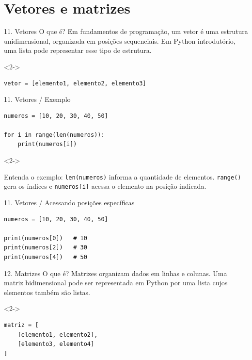 \section{Vetores e matrizes}

\begin{frame}[fragile,t]{11. Vetores}
O que é? Em fundamentos de programação, um vetor é uma estrutura unidimensional, organizada em posições sequenciais. Em Python introdutório, uma lista pode representar esse tipo de estrutura.\par
\begin{visibleenv}<2->
\begin{lstlisting}
vetor = [elemento1, elemento2, elemento3]
\end{lstlisting}
\end{visibleenv}
\end{frame}

\begin{frame}[fragile,t]{11. Vetores / Exemplo}
\begin{lstlisting}
numeros = [10, 20, 30, 40, 50]

for i in range(len(numeros)):
    print(numeros[i])
\end{lstlisting}
\begin{visibleenv}<2->
\begin{EMASCnote}
Entenda o exemplo: \texttt{len(numeros)} informa a quantidade de elementos. \texttt{range()} gera os índices e \texttt{numeros[i]} acessa o elemento na posição indicada.
\end{EMASCnote}
\end{visibleenv}
\end{frame}

\begin{frame}[fragile,t]{11. Vetores / Acessando posições específicas}
\begin{lstlisting}
numeros = [10, 20, 30, 40, 50]

print(numeros[0])   # 10
print(numeros[2])   # 30
print(numeros[4])   # 50
\end{lstlisting}
\end{frame}

\begin{frame}[fragile,t]{12. Matrizes}
O que é? Matrizes organizam dados em linhas e colunas. Uma matriz bidimensional pode ser representada em Python por uma lista cujos elementos também são listas.\par
\begin{visibleenv}<2->
\begin{lstlisting}
matriz = [
    [elemento1, elemento2],
    [elemento3, elemento4]
]
\end{lstlisting}
\end{visibleenv}
\end{frame}

